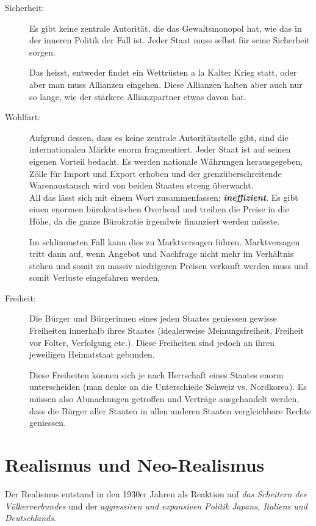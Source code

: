 \documentclass[a4paper, 11pt]{article}
\begin{document}
\begin{description}
	\item[Sicherheit: ] Es gibt keine zentrale Autorität, die das Gewaltsmonopol hat, wie das in der inneren Politik der Fall ist. Jeder Staat muss selbst für seine Sicherheit sorgen.
	
	
	Das heisst, entweder findet ein Wettrüsten a la Kalter Krieg statt, oder aber man muss Allianzen eingehen. Diese Allianzen halten aber auch nur so lange, wie der stärkere Allianzpartner etwas davon hat.
	\item[Wohlfart: ] Aufgrund dessen, dass es keine zentrale Autoritätsstelle 	gibt, sind die internationalen Märkte enorm fragmentiert. Jeder Staat ist auf seinen eigenen Vorteil bedacht. Es werden nationale Währungen herausgegeben, Zölle für Import und Export erhoben und der grenzüberschreitende Warenaustausch wird von beiden Staaten streng überwacht. \\
	All das lässt sich mit einem Wort zusammenfassen: \textit{\textbf{ineffizient}}. Es gibt einen enormen bürokratischen Overhead und treiben die Preise in die Höhe, da die ganze Bürokratie irgendwie finanziert werden müsste.
	
	
	Im schlimmsten Fall kann dies zu Marktversagen führen. Marktversagen tritt dann auf, wenn Angebot und Nachfrage nicht mehr im Verhältnis stehen und somit zu massiv niedrigeren Preisen verkauft werden muss und somit Verluste eingefahren werden.
	
	\item[Freiheit: ] Die Bürger und Bürgerinnen eines jeden Staates geniessen gewisse Freiheiten innerhalb ihres Staates (idealerweise Meinungsfreiheit, Freiheit vor Folter, Verfolgung etc.). Diese Freiheiten sind jedoch an ihren jeweiligen Heimatstaat gebunden.
	
	
	Diese Freiheiten können sich je nach Herrschaft eines Staates enorm unterscheiden (man denke an die Unterschiede Schweiz vs. Nordkorea). Es müssen also Abmachungen getroffen und Verträge ausgehandelt werden, dass die Bürger aller Staaten in allen anderen Staaten vergleichbare Rechte geniessen.
\end{description}



\newpage

\section{Realismus und Neo-Realismus}

Der Realismus entstand in den 1930er Jahren als Reaktion auf \textit{das Scheitern des Völkerverbundes} und der \textit{aggressiven und expansiven Politik Japans, Italiens und Deutschlands}.
\end{document}
